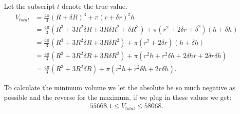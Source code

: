 \documentclass[10pt]{article}
\begin{document}
\begin{solution}[2]  \label{sol:2}
Let the subscript \(t\) denote the true value.
\begin{align*}
V _{total}  &  = \frac{4 \pi}{3} (R + \delta R)^{3} + \pi (r+ \delta r) ^2 h \\
& = \frac{4 \pi}{3} (R^{3} + 3 R^2 \delta R + 3 R \delta R ^2 + \delta R^{3})
+ \pi (r ^2 + 2 \delta r+ \delta ^2) (h + \delta h) \\
& = \frac{4 \pi}{3} (R^{3} + 3 R^2 \delta R + 3 R \delta R ^2)
+ \pi (r ^2 + 2 \delta r) (h + \delta h) \\
& = \frac{4 \pi}{3} (R^{3} + 3 R^2 \delta R + 3 R \delta R ^2)
+ \pi (r ^2 h + r ^2 \delta h + 2 \delta h r + 2 \delta r \delta h) \\
& = \frac{4 \pi}{3} (R^{3} + 3 R^2 \delta R)
+ \pi (r ^2 h + r ^2 \delta h + 2r \delta h )
.
\end{align*}

To calculate the minimum volume we let the absolute be so much negative
as possible and the reverse for the maximum, if we plug in these values
we get:
\begin{align*}
55668.1 \leq V _{total} \leq 58068
.
\end{align*}


\end{solution}
\end{document}
